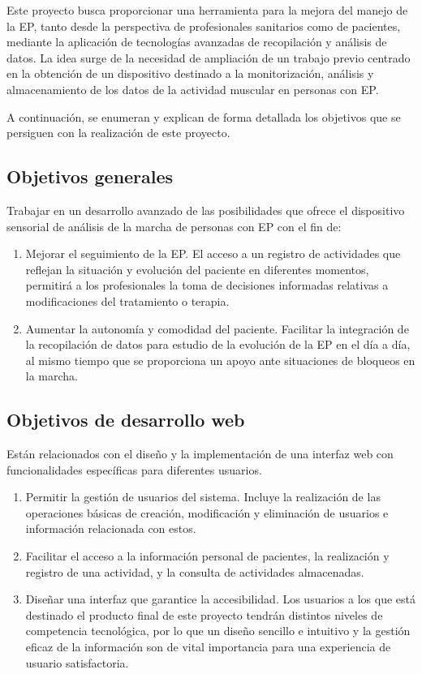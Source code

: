 
Este proyecto busca proporcionar una herramienta para la mejora del manejo de la EP, tanto desde la perspectiva de profesionales sanitarios como de pacientes, mediante la aplicación de tecnologías avanzadas de recopilación y análisis de datos. La idea surge de la necesidad de ampliación de un trabajo previo centrado en la obtención de un dispositivo destinado a la monitorización, análisis y almacenamiento de los datos de la actividad muscular en personas con EP. 

A continuación, se enumeran y explican de forma detallada los objetivos que se persiguen con la realización de este proyecto.

\subsection{Objetivos generales}
Trabajar en un desarrollo avanzado de las posibilidades que ofrece el dispositivo sensorial de análisis de la marcha de personas con EP con el fin de:
\begin{enumerate}
    \item Mejorar el seguimiento de la EP. El acceso a un registro de actividades que reflejan la situación y evolución del paciente en diferentes momentos, permitirá a los profesionales la toma de decisiones informadas relativas a modificaciones del tratamiento o terapia.
    \item Aumentar la autonomía y comodidad del paciente. Facilitar la integración de la recopilación de datos para estudio de la evolución de la EP en el día a día, al mismo tiempo que se proporciona un apoyo ante situaciones de bloqueos en la marcha.
\end{enumerate}

\subsection{Objetivos de desarrollo web}
Están relacionados con el diseño y la implementación de una interfaz web con funcionalidades específicas para diferentes usuarios. 
\begin{enumerate}
    \item Permitir la gestión de usuarios del sistema. Incluye la realización de las operaciones básicas de creación, modificación y eliminación de usuarios e información relacionada con estos.
    \item Facilitar el acceso a la información personal de pacientes, la realización y registro de una actividad, y la consulta de actividades almacenadas.
    \item Diseñar una interfaz que garantice la accesibilidad. Los usuarios a los que está destinado el producto final de este proyecto tendrán distintos niveles de competencia tecnológica, por lo que un diseño sencillo e intuitivo y la gestión eficaz de la información son de vital importancia para una experiencia de usuario satisfactoria.
\end{enumerate}


